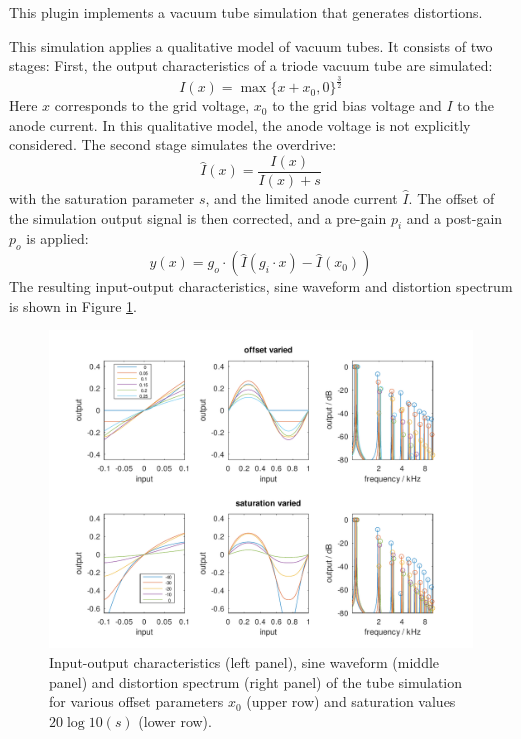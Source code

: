 This plugin implements a vacuum tube simulation that generates distortions.

This simulation applies a qualitative model of vacuum tubes. It consists of two stages: First, the output characteristics of a triode vacuum tube are simulated:
%
\begin{equation}
  I(x) = \max\{x+x_0,0\}^{\frac32}
\end{equation}
%
Here $x$ corresponds to the grid voltage, $x_0$ to the grid bias voltage and $I$ to the anode current. In this qualitative model, the anode voltage is not explicitly considered.
%
The second stage simulates the overdrive:
\begin{equation}
  \hat I(x) = \frac{I(x)}{I(x)+s}
\end{equation}
with the saturation parameter $s$, and the limited anode current $\hat I$.
%
The offset of the simulation output signal is then corrected, and a pre-gain $p_i$ and a post-gain $p_o$ is applied:
\begin{equation}
  y(x) = g_o \cdot \left(\hat I \left(g_i \cdot x \right) - \hat I\left(x_0\right)\right)
\end{equation}
%
The resulting input-output characteristics, sine waveform and distortion spectrum is shown in Figure \ref{fig:tubesim}.

\begin{figure}[htb]
  \includegraphics[width=\textwidth]{tubesim.pdf}
  \caption{Input-output characteristics (left panel), sine waveform (middle panel) and distortion spectrum (right panel) of the tube simulation for various offset parameters $x_0$ (upper row) and saturation values $20\log10(s)$ (lower row).}\label{fig:tubesim}
\end{figure}




